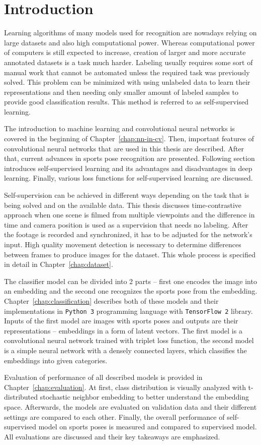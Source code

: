 \chapter{\label{chap:intro}Introduction}

Learning algorithms of many models used for recognition are nowadays relying on large datasets and also high computational power. Whereas computational power of computers is still expected to increase, creation of larger and more accurate annotated datasets is a task much harder. Labeling usually requires some sort of manual work that cannot be automated unless the required task was previously solved. This problem can be minimized with using unlabeled data to learn their representations and then needing only smaller amount of labeled samples to provide good classification results. This method is referred to as self-supervised learning.

The introduction to machine learning and convolutional neural networks is covered in the beginning of Chapter~\ref{chap:nn-in-cv}. Then, important features of convolutional neural networks that are used in this thesis are described. After that, current advances in sports pose recognition are presented. Following section introduces self-supervised learning and its advantages and disadvantages in deep learning. Finally, various loss functions for self-supervised learning are discussed.

Self-supervision can be achieved in different ways depending on the task that is being solved and on the available data. This thesis discusses time-contrastive approach when one scene is filmed from multiple viewpoints and the difference in time and camera position is used as a supervision that needs no labeling. After the footage is recorded and synchronized, it has to be adjusted for the network's input. High quality movement detection is necessary to determine differences between frames to produce images for the dataset. This whole process is specified in detail in Chapter~\ref{chap:dataset}.

The classifier model can be divided into 2 parts -- first one encodes the image into an embedding and the second one recognizes the sports pose from the embedding. Chapter~\ref{chap:classification} describes both of these models and their implementations in \texttt{Python 3} programming language with \texttt{TensorFlow 2} library. Inputs of the first model are images with sports poses and outputs are their representations -- embeddings in a form of latent vectors. The first model is a convolutional neural network trained with triplet loss function, the second model is a simple neural network with a densely connected layers, which classifies the embeddings into given categories.

Evaluation of performance of all described models is provided in Chapter~\ref{chap:evaluation}. At first, class distribution is visually analyzed with t-distributed stochastic neighbor embedding to better understand the embedding space. Afterwards, the models are evaluated on validation data and their different settings are compared to each other. Finally, the overall performance of self-supervised model on sports poses is measured and compared to supervised model. All evaluations are discussed and their key takeaways are emphasized.
